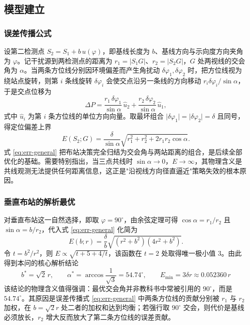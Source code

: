 \documentclass[12pt,a4paper]{ctexart}
\begin{document}
\subsection{模型建立}

\subsubsection{误差传播公式}

设第二检测点 $S_2=S_1+b\,u(\varphi)$，即基线长度为 $b$、基线方向与示向度方向夹角为 $\varphi$。记干扰源到两检测点的距离为 $r_1=\lvert S_1G\rvert$、$r_2=\lvert S_2G\rvert$，$G$ 处两视线的交会角为 $\alpha$。当两条方位线分别因环境偏差而产生角扰动 $\delta\varphi_1,\delta\varphi_2$ 时，把方位线视为绕站点旋转，则第 $i$ 条线旋转 $\delta\varphi_i$ 会使交点沿另一条线的方向移动 $r_i\delta\varphi_i/\sin\alpha$，于是交点位移为
\begin{equation}
\Delta P=\frac{r_1\,\delta\varphi_1}{\sin\alpha}\,\hat u_2+\frac{r_2\,\delta\varphi_2}{\sin\alpha}\,\hat u_1,
\label{eq:err-vec}
\end{equation}
式中 $\hat u_i$ 为第 $i$ 条方位线的单位方向向量。取最坏组合 $\lvert\delta\varphi_1\rvert=\lvert\delta\varphi_2\rvert=\delta$ 且同号，得定位偏差上界
\begin{equation}
E(S_2;G)=\frac{\delta}{\sin\alpha}\sqrt{r_1^2+r_2^2+2r_1r_2\cos\alpha}.
\label{eq:err-general}
\end{equation}
式 \eqref{eq:err-general} 把布站决策完全归结为交会角与两站距离的组合，是后续全部优化的基础。需要特别指出，当三点共线时 $\sin\alpha\to0$，$E\to\infty$，其物理含义是共线观测无法提供任何距离信息，这正是"沿视线方向径直逼近"策略失效的根本原因。

\subsubsection{垂直布站的解析最优}

对垂直布站这一自然选择，即取 $\varphi=90^\circ$，由余弦定理可得 $\cos\alpha=r_1/r_2$ 且 $\sin\alpha=b/r_2$，代入式 \eqref{eq:err-general} 化简为
\begin{equation}
E(b;r)=\frac{\delta}{b}\sqrt{(r^2+b^2)(4r^2+b^2)} .
\label{eq:err-perp}
\end{equation}
令 $t=b^2/r^2$，则 $E\propto\sqrt{t+5+4/t}$，该函数在 $t=2$ 处取得唯一极小值 $3$。由此得到本问的核心解析结论
\begin{equation}
\boxed{\quad b^{*}=\sqrt2\,r,\qquad
\alpha^{*}=\arccos\frac{1}{\sqrt3}=54.74^\circ,\qquad
E_{\min}=3\delta r\approx0.052360\,r \quad}
\label{eq:opt-b}
\end{equation}
该结论的物理含义值得强调：最优交会角并非教科书中常被引用的 $90^\circ$，而是 $54.74^\circ$。其原因是误差传播式 \eqref{eq:err-general} 中两条方位线的贡献分别被 $r_1$ 与 $r_2$ 加权，在 $b=\sqrt2r$ 处二者的加权和达到均衡；若强行取 $90^\circ$ 交会，则代价是基线必须放长，$r_2$ 增大反而放大了第二条方位线的误差贡献。
\end{document}
